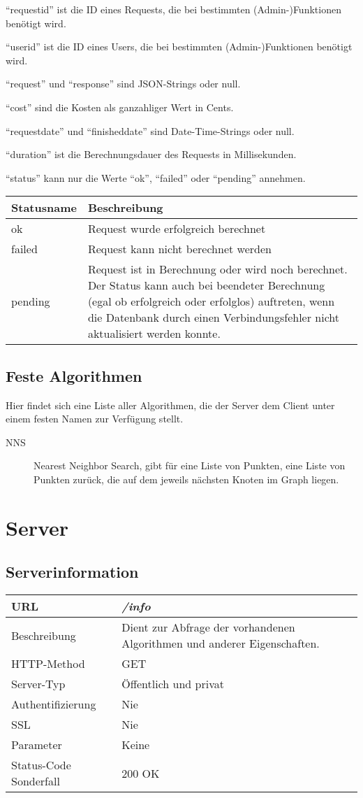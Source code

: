 \documentclass[ngerman,titlepage,parskip=true]{scrartcl}
\newcommand{\requestURL}[1]{\textit{#1}}
\newcommand{\request}[9]
{\subsection{#1}
\begin{tabular}{|p{0.2\textwidth}|p{0.7\textwidth}|}
\hline
  URL & \requestURL{#2}\\\hline
    Beschreibung & #3\\\hline
  HTTP-Method & #4\\\hline
  Server-Typ & #5\\\hline
  Authentifizierung & #6\\\hline
  SSL & #7\\\hline
  Parameter & #8\\\hline
  Status-Code Sonderfall & #9\\\hline
 \end{tabular}\vspace*{1em}}
{}%
{}%
{}%
{}%
{}%
{}%
{}%
{}%
\begin{document}
	``requestid'' ist die ID eines Requests, die bei bestimmten (Admin-)Funktionen benötigt wird.

	``userid'' ist die ID eines Users, die bei bestimmten (Admin-)Funktionen benötigt wird.
	
	``request'' und ``response'' sind JSON-Strings oder null.
	
	``cost'' sind die Kosten als ganzahliger Wert in Cents.

	``requestdate'' und ``finisheddate'' sind Date-Time-Strings oder null.
	
	``duration'' ist die Berechnungsdauer des Requests in Millisekunden.
	
	``status'' kann nur die Werte ``ok'', ``failed'' oder ``pending'' annehmen.
	
	\begin{tabular}{|p{}|p{}|}
	\hline
	Statusname 	& Beschreibung \\\hline
	ok 			& Request wurde erfolgreich berechnet\\
	failed 		& Request kann nicht berechnet werden \\
	pending 	& Request ist in Berechnung oder wird noch berechnet. Der Status kann auch bei beendeter Berechnung (egal ob erfolgreich oder erfolglos) auftreten, wenn die Datenbank durch einen Verbindungsfehler nicht aktualisiert werden konnte. \\
	\hline
	\end{tabular}	
	
	

\subsection{Feste Algorithmen} 
Hier findet sich eine Liste aller Algorithmen, die der Server dem Client unter einem festen Namen zur Verfügung stellt.

\begin{description}
\item[NNS] Nearest Neighbor Search, gibt für eine Liste von Punkten, eine Liste von Punkten zurück, die auf dem jeweils nächsten Knoten im Graph liegen.
\end{description}

\clearpage
\section{Server}

\request{Serverinformation}
{/info}
{Dient zur Abfrage der vorhandenen Algorithmen und anderer Eigenschaften.}
{GET}
{Öffentlich und privat}
{Nie}
{Nie}
{Keine}
{200 OK}
\end{document}
